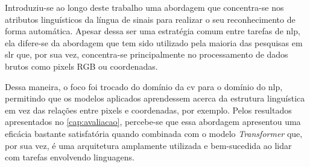 Introduziu-se ao longo deste trabalho uma abordagem que concentra-se nos atributos linguísticos da língua de sinais para realizar o seu reconhecimento de forma automática.
Apesar dessa ser uma estratégia comum entre tarefas de \acrfull{nlp}, ela difere-se da abordagem que tem sido utilizado pela maioria das pesquisas em \acrfull{slr} que, por sua vez, concentra-se principalmente no processamento de dados brutos como pixels RGB ou coordenadas.


Dessa maneira, o foco foi trocado do domínio da \acrfull{cv} para o domínio do \acrshort{nlp}, permitindo que os modelos aplicados aprendessem acerca da estrutura linguística em vez das relações entre pixels e coordenadas, por exemplo.
Pelos resultados apresentados no \autoref{cap:avaliacao}, percebe-se que essa abordagem apresentou uma eficácia bastante satisfatória quando combinada com o modelo \textit{Transformer} que, por sua vez, é uma arquitetura amplamente utilizada e bem-sucedida ao lidar com tarefas envolvendo linguagens.


